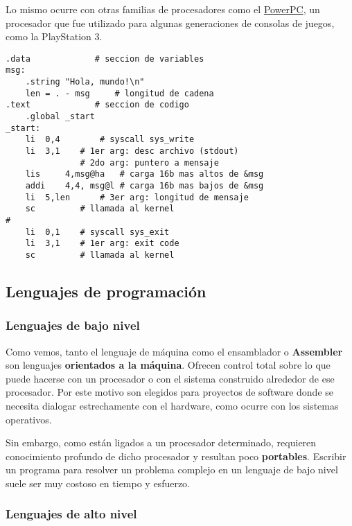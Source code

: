 \documentclass[spanish,a4paper,]{article}
\begin{document}
Lo mismo ocurre con otras familias de procesadores como el
\href{https://es.m.wikipedia.org/wiki/PowerPC}{PowerPC}, un procesador
que fue utilizado para algunas generaciones de consolas de juegos, como
la PlayStation 3.

\begin{verbatim}
.data             # seccion de variables
msg:
    .string "Hola, mundo!\n"
    len = . - msg     # longitud de cadena
.text             # seccion de codigo
    .global _start
_start:
    li  0,4        # syscall sys_write
    li  3,1    # 1er arg: desc archivo (stdout)
               # 2do arg: puntero a mensaje
    lis     4,msg@ha   # carga 16b mas altos de &msg
    addi    4,4, msg@l # carga 16b mas bajos de &msg
    li  5,len      # 3er arg: longitud de mensaje
    sc         # llamada al kernel
# 
    li  0,1    # syscall sys_exit
    li  3,1    # 1er arg: exit code
    sc         # llamada al kernel
\end{verbatim}

\hypertarget{lenguajes-de-programaciuxf3n}{%
\subsection{Lenguajes de
programación}\label{lenguajes-de-programaciuxf3n}}

\hypertarget{lenguajes-de-bajo-nivel-1}{%
\subsubsection{Lenguajes de bajo
nivel}\label{lenguajes-de-bajo-nivel-1}}

Como vemos, tanto el lenguaje de máquina como el ensamblador o
\textbf{Assembler} son lenguajes \textbf{orientados a la máquina}.
Ofrecen control total sobre lo que puede hacerse con un procesador o con
el sistema construido alrededor de ese procesador. Por este motivo son
elegidos para proyectos de software donde se necesita dialogar
estrechamente con el hardware, como ocurre con los sistemas operativos.

Sin embargo, como están ligados a un procesador determinado, requieren
conocimiento profundo de dicho procesador y resultan poco
\textbf{portables}. Escribir un programa para resolver un problema
complejo en un lenguaje de bajo nivel suele ser muy costoso en tiempo y
esfuerzo.

\hypertarget{lenguajes-de-alto-nivel}{%
\subsubsection{Lenguajes de alto nivel}\label{lenguajes-de-alto-nivel}}
\end{document}
